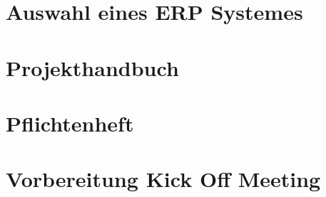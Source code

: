 \documentclass[12pt]{article}
\begin{document}
\section{Auswahl eines ERP Systemes}
\section*{Projekthandbuch}
\section*{Pflichtenheft}
\section*{Vorbereitung Kick Off Meeting}




\newpage
\listoftables
\listoffigures
\end{document}
